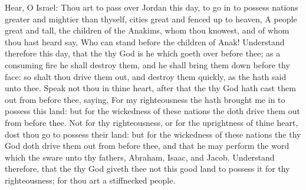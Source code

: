 \begin{biblechapter} %
\verse Hear, O Israel: Thou art to pass over Jordan this day, to go in to possess nations greater and mightier than thyself, cities great and fenced up to heaven,
\verse A people great and tall, the children of the Anakims, whom thou knowest, and of whom thou hast heard say, Who can stand before the children of Anak!
\verse Understand therefore this day, that the \LORD thy God is he which goeth over before thee; as a consuming fire he shall destroy them, and he shall bring them down before thy face: so shalt thou drive them out, and destroy them quickly, as the \LORD hath said unto thee.
\verse Speak not thou in thine heart, after that the \LORD thy God hath cast them out from before thee, saying, For my righteousness the \LORD hath brought me in to possess this land: but for the wickedness of these nations the \LORD doth drive them out from before thee.
\verse Not for thy righteousness, or for the uprightness of thine heart, dost thou go to possess their land: but for the wickedness of these nations the \LORD thy God doth drive them out from before thee, and that he may perform the word which the \LORD sware unto thy fathers, Abraham, Isaac, and Jacob.
\verse Understand therefore, that the \LORD thy God giveth thee not this good land to possess it for thy righteousness; for thou art a stiffnecked people.

\end{biblechapter}
